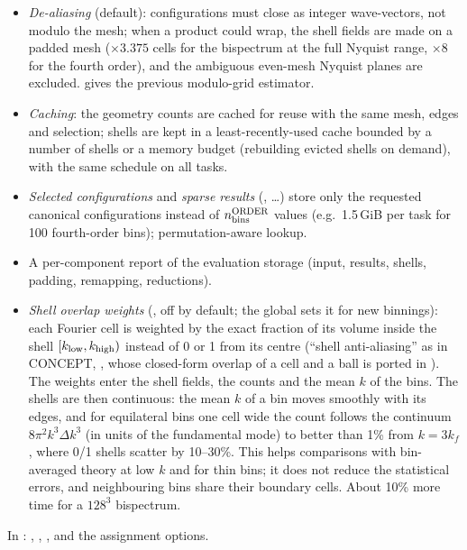 \begin{itemize}
\item \emph{De-aliasing} (default): configurations must close as integer wave-vectors, not modulo the mesh; when a product could wrap, the shell fields
      are made on a padded mesh ($\times3.375$ cells for the bispectrum at the full Nyquist range, $\times8$ for the fourth order), and the ambiguous
      even-mesh Nyquist planes are excluded.  gives the previous modulo-grid estimator.
\item \emph{Caching}: the geometry counts are cached for reuse with the same mesh, edges and selection; shells are kept in a least-recently-used cache
      bounded by a number of shells or a memory budget (rebuilding evicted shells on demand), with the same schedule on all tasks.
\item \emph{Selected configurations} and \emph{sparse results} (, \ldots) store only the requested canonical
      configurations instead of $n_{\rm bins}^{\rm ORDER}$ values (e.g.\ 1.5\,GiB per task for 100 fourth-order bins); permutation-aware lookup.
\item A per-component report of the evaluation storage (input, results, shells, padding, remapping, reductions).
\item \emph{Shell overlap weights} (, off by default; the global
       sets it for new binnings): each Fourier cell is weighted by the
      exact fraction of its volume inside the shell $[k_{\rm low},k_{\rm high})$ instead of 0 or 1 from its centre
      (``shell anti-aliasing'' as in CONCEPT, , whose closed-form overlap of a cell and a ball is ported in
      ). The weights enter the shell fields, the counts and the mean $k$ of the bins. The shells are
      then continuous: the mean $k$ of a bin moves smoothly with its edges, and for equilateral bins one cell wide the
      count follows the continuum $8\pi^2k^3\Delta k^3$ (in units of the fundamental mode) to better than 1\% from $k=3k_f$,
      where 0/1 shells scatter by 10--30\%. This helps comparisons with bin-averaged theory at low $k$ and for thin bins;
      it does not reduce the statistical errors, and neighbouring bins share their boundary cells. About 10\% more
      time for a $128^3$ bispectrum.
\end{itemize}
In : , , ,
 and the assignment options.

